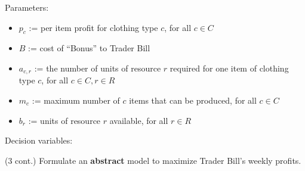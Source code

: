 \documentclass[12pt]{exam}
\newcommand{\answerbox}[3]{%
  \fbox{%
    \begin{minipage}[#1]{#2}
      \hfill\vspace{#3}
    \end{minipage}
  }
}
\newcommand{\answerboxone}[2]{%
  \answerbox{#1}{6.0in}{#2} 
}
\begin{document}
\begin{questions}
Parameters:
\begin{itemize}
\item  $p_{c}$ := per item profit for clothing type $c$, for all $c \in C$
\item  $B$ := cost of ``Bonus'' to Trader Bill
\item  $a_{c,r}$ := the number of units of resource $r$ required for one item of clothing type $c$, for all $c \in C, r \in R$
\item  $m_{c}$ := maximum number of $c$ items that can be produced, for all $c\in C$
\item  $b_{r}$ := units of resource $r$ available, for all $r \in R$
\end{itemize}

Decision variables:

\answerboxone{c}{2in}

\newpage
(3 cont.) Formulate an \textbf{abstract} model to maximize Trader Bill's weekly profits.  




\end{questions}

\end{document}
